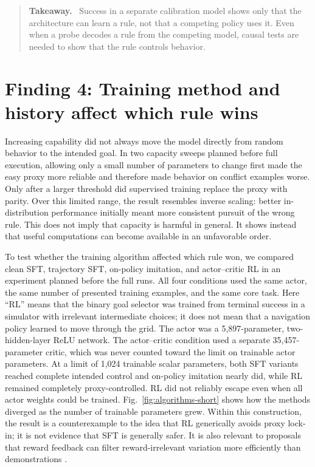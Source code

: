 \documentclass[11pt,a4paper]{article}
\newcommand{\fig}[1]{Fig.~\ref{#1}}
\newenvironment{takeaway}{%
  \begin{quote}\small\color{ink}\noindent\textbf{Takeaway.}\ 
}{%
  \end{quote}
}
\begin{document}
\begin{takeaway}
Success in a separate calibration model shows only that the architecture can learn a rule, not that a competing policy uses it. Even when a probe decodes a rule from the competing model, causal tests are needed to show that the rule controls behavior.
\end{takeaway}

\section*{Finding 4: Training method and history affect which rule wins}

Increasing capability did not always move the model directly from random behavior to the intended goal. In two capacity sweeps planned before full execution, allowing only a small number of parameters to change first made the easy proxy more reliable and therefore made behavior on conflict examples worse. Only after a larger threshold did supervised training replace the proxy with parity. Over this limited range, the result resembles inverse scaling: better in-distribution performance initially meant more consistent pursuit of the wrong rule. This does not imply that capacity is harmful in general. It shows instead that useful computations can become available in an unfavorable order.

To test whether the training algorithm affected which rule won, we compared clean SFT, trajectory SFT, on-policy imitation, and actor--critic RL in an experiment planned before the full runs. All four conditions used the same actor, the same number of presented training examples, and the same core task. Here ``RL'' means that the binary goal selector was trained from terminal success in a simulator with irrelevant intermediate choices; it does not mean that a navigation policy learned to move through the grid. The actor was a 5,897-parameter, two-hidden-layer ReLU network. The actor--critic condition used a separate 35,457-parameter critic, which was never counted toward the limit on trainable actor parameters. At a limit of 1,024 trainable scalar parameters, both SFT variants reached complete intended control and on-policy imitation nearly did, while RL remained completely proxy-controlled. RL did not reliably escape even when all actor weights could be trained. \fig{fig:algorithms-short} shows how the methods diverged as the number of trainable parameters grew. Within this construction, the result is a counterexample to the idea that RL generically avoids proxy lock-in; it is not evidence that SFT is generally safer. It is also relevant to proposals that reward feedback can filter reward-irrelevant variation more efficiently than demonstrations \citep{morris2026reason}.
\end{document}
